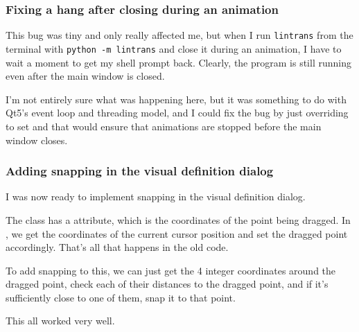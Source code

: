 \documentclass[../development.tex]{subfiles}
\begin{document}
\subsubsection{Fixing a hang after closing during an animation\label{development:teacher-suggestions:fixing-a-hang-after-closing-during-an-animation}}

This bug was tiny and only really affected me, but when I run \texttt{lintrans} from the terminal with \texttt{python -m lintrans} and close it during an animation, I have to wait a moment to get my shell prompt back. Clearly, the program is still running even after the main window is closed.

I'm not entirely sure what was happening here, but it was something to do with Qt5's event loop and threading model, and I could fix the bug by just overriding  to set  and that would ensure that animations are stopped before the main window closes.


\subsubsection{Adding snapping in the visual definition dialog\label{development:teacher-suggestions:adding-snapping-in-the-visual-definition-dialog}}

I was now ready to implement snapping in the visual definition dialog.

The  class has a  attribute, which is the coordinates of the point being dragged. In , we get the coordinates of the current cursor position and set the dragged point accordingly. That's all that happens in the old code.


To add snapping to this, we can just get the 4 integer coordinates around the dragged point, check each of their distances to the dragged point, and if it's sufficiently close to one of them, snap it to that point.


This all worked very well.
\end{document}
